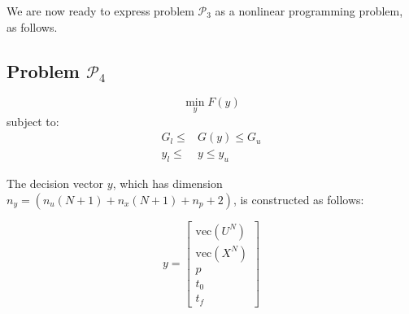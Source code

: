 \documentclass[a4paper,11pt]{report}    %
\begin{document}
We are now ready to express problem $\mathcal{P}_3$ as a nonlinear programming problem, as follows.

\subsection*{Problem $\mathcal{P}_4$}
\begin{equation}
   \min_y  F(y)
\end{equation}
subject to:
\begin{equation}
 \begin{aligned}
    G_l \le &G(y) \le G_u \\
    y_l \le &y  \le y_u
 \end{aligned}
\end{equation}

The decision vector $y$, which has dimension $n_y=(n_u(N+1)+n_x(N+1)+n_p+2)$, is constructed
as follows:

\begin{equation} \label{single_phase_dv}
   y = \begin{bmatrix}
          \mathrm{vec}(U^N) \\
          \mathrm{vec}(X^N) \\
          p        \\
          t_0      \\
          t_f     
       \end{bmatrix}
\end{equation}
\end{document}

